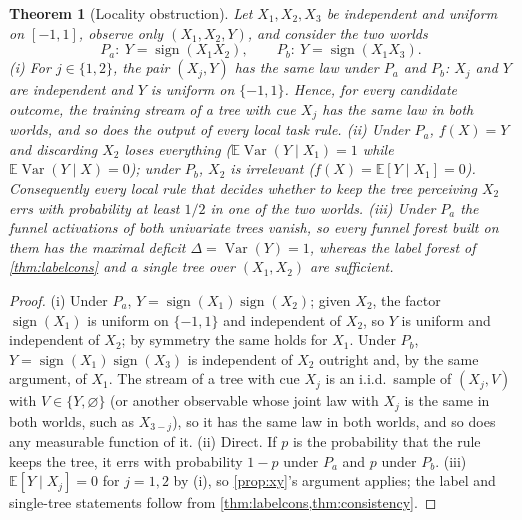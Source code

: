 \documentclass[11pt]{article}
\newtheorem{theorem}{Theorem}
\theoremstyle{definition}
\theoremstyle{remark}
\newcommand{\E}{\mathbb{E}}
\newcommand{\Var}{\operatorname{Var}}
\begin{document}
\begin{theorem}[Locality obstruction]\label{thm:locality}
Let $X_1,X_2,X_3$ be independent and uniform on $[-1,1]$, observe only $(X_1,X_2,Y)$,
and consider the two worlds
\[
  P_a:\ Y=\operatorname{sign}(X_1X_2),\qquad P_b:\ Y=\operatorname{sign}(X_1X_3).
\]
(i) For $j\in\{1,2\}$, the pair $(X_j,Y)$ has the same law under $P_a$ and $P_b$: $X_j$
and $Y$ are independent and $Y$ is uniform on $\{-1,1\}$.  Hence, for every candidate
outcome, the training stream of a tree with cue $X_j$ has the same law in both worlds,
and so does the output of every local task rule.  (ii) Under $P_a$, $f(X)=Y$ and
discarding $X_2$ loses everything ($\E\Var(Y\mid X_1)=1$ while $\E\Var(Y\mid X)=0$);
under $P_b$, $X_2$ is irrelevant ($f(X)=\E[Y\mid X_1]=0$).  Consequently every local
rule that decides whether to keep the tree perceiving $X_2$ errs with probability at
least $1/2$ in one of the two worlds.  (iii) Under $P_a$ the funnel activations of both
univariate trees vanish, so every funnel forest built on them has the maximal deficit
$\Delta=\Var(Y)=1$, whereas the label forest of \cref{thm:labelcons} and a single tree
over $(X_1,X_2)$ are sufficient.
\end{theorem}
\begin{proof}
(i) Under $P_a$, $Y=\operatorname{sign}(X_1)\operatorname{sign}(X_2)$; given $X_2$, the
factor $\operatorname{sign}(X_1)$ is uniform on $\{-1,1\}$ and independent of $X_2$, so
$Y$ is uniform and independent of $X_2$; by symmetry the same holds for $X_1$.  Under
$P_b$, $Y=\operatorname{sign}(X_1)\operatorname{sign}(X_3)$ is independent of $X_2$
outright and, by the same argument, of $X_1$.  The stream of a tree with cue $X_j$ is an
i.i.d.\ sample of $(X_j,V)$ with $V\in\{Y,\varnothing\}$ (or another observable whose
joint law with $X_j$ is the same in both worlds, such as $X_{3-j}$), so it has the same
law in both worlds, and so does any measurable function of it.  (ii) Direct.  If $p$ is
the probability that the rule keeps the tree, it errs with probability $1-p$ under
$P_a$ and $p$ under $P_b$.  (iii) $\E[Y\mid X_j]=0$ for $j=1,2$ by (i), so
\cref{prop:xy}'s argument applies; the label and single-tree statements follow from
\cref{thm:labelcons,thm:consistency}.
\end{proof}
\end{document}
